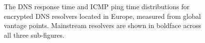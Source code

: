 \begin{figure}[t!]
\hfill%
%
\hfill%
%
\hfill%
%
    \caption{The DNS response time and ICMP ping time distributions for
    encrypted DNS resolvers located in Europe, measured from global vantage points.
    Mainstream resolvers are shown in boldface across all three
    sub-figures.}
\label{fig:dns-europe}
\end{figure}


